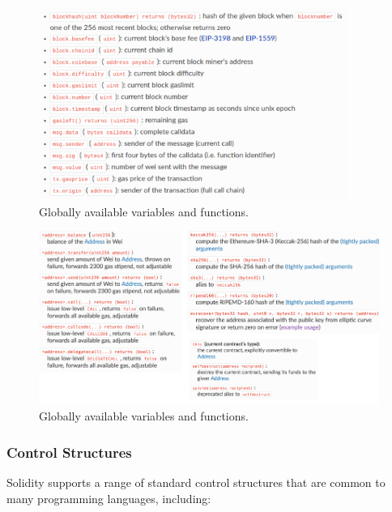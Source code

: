\begin{figure}[t]
	\begin{center}
		\includegraphics[width=0.9\textwidth]{./figs/vars-funcs.png}
		\caption{Globally available variables and functions.}		
		\label{fig:special-vars}
	\end{center}	
\end{figure}

\begin{figure}[t]
	\begin{center}
		\includegraphics[width=0.99\textwidth]{./figs/functions2.png}
		\caption{Globally available variables and functions.}		
		\label{fig:special-vars2}
	\end{center}	
\end{figure}

\subsubsection{Control Structures}\label{control-structures}

Solidity supports a range of standard control structures that are common
to many programming languages, including:

